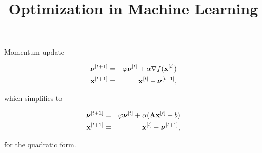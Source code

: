 \documentclass[11pt,compress,t,notes=noshow, xcolor=table]{beamer}
\title{Optimization in Machine Learning}
\begin{document}


\begin{vbframe}{Momentum update}

\begin{eqnarray*}
 \boldsymbol{\nu}^{[ t+1 ] } &=& \varphi \boldsymbol{\nu}^{[ t ] } + \alpha \nabla f(\mathbf{x}^{[ t ] }) \\
 \mathbf{x}^{[ t+1 ] } &=& \mathbf{x}^{[ t ] } - \boldsymbol{\nu}^{[ t+1 ] }, 
\end{eqnarray*}

which simplifies to 

\begin{eqnarray*}
	\boldsymbol{\nu}^{[ t+1 ] } &=& \varphi \boldsymbol{\nu}^{[ t ] } + \alpha (\mathbf{A} \mathbf{x}^{[ t ] } - b)  \\
	\mathbf{x}^{[ t+1 ] } &=& \mathbf{x}^{[ t ] } - \boldsymbol{\nu}^{[ t+1 ] }, 
\end{eqnarray*}

for the quadratic form. 

\end{vbframe}
\end{document}
